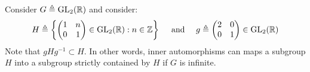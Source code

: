 \documentclass{report}
\begin{document}
\begin{example}
  Consider $G\triangleq \operatorname{GL}_2(\mathbb{R})$  and consider: 
\begin{align*}
H\triangleq \left\{  \begin{pmatrix}
    1 & n \\
    0 & 1
\end{pmatrix} \in \operatorname{GL}_2(\mathbb{R}) : n \in\mathbb{Z} \right\}  \quad \text{ and }\quad g\triangleq \begin{pmatrix} 
 2 & 0 \\
 0 & 1
\end{pmatrix} \in \operatorname{GL}_2(\mathbb{R})
\end{align*}
Note that $gHg^{-1}\subset H $. In other words, inner automorphisms can maps a subgroup $H$ into a subgroup strictly contained by $H$ if  $G$ is infinite. 
\end{example}
\end{document}
